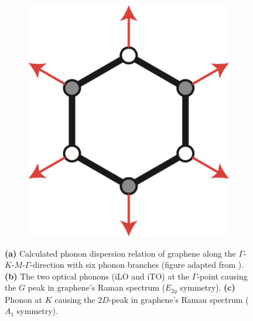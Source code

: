 \begin{figure}[!h]
\begin{subfigure}{0.25\textwidth}
    \includegraphics[width=\textwidth]{./images/2d-mode-phonon.png}
  \end{subfigure}
  \caption{\textbf{(a)} Calculated phonon dispersion relation of graphene along the $\Gamma$-$K$-$M$-$\Gamma$-direction with six phonon branches (figure adapted from \cite{Malard2009}). \textbf{(b)} The two optical phonons (iLO and iTO) at the $\Gamma$-point causing the $G$ peak in graphene's Raman spectrum ($E_{2g}$ symmetry). \textbf{(c)} Phonon at $K$ causing the $2D$-peak in graphene's Raman spectrum ($A_1$ symmetry).}
  \label{fig:phonons}
\end{figure}

\newpage

